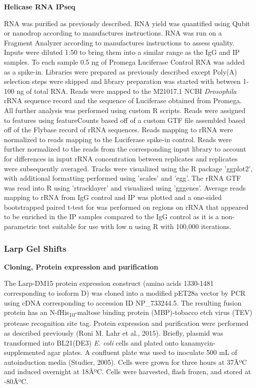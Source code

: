 \documentclass[12pt,oneside]{reedthesis}
\begin{document}
\textbf{Helicase RNA IPseq}

RNA was purified as previously described. RNA yield was quantified using
Qubit or nanodrop according to manufactures instructions. RNA was run on
a Fragment Analyzer according to manufactures instructions to assess
quality. Inputs were diluted 1:50 to bring them into a similar range as
the IgG and IP samples. To each sample 0.5 ng of Promega Luciferase
Control RNA was added as a spike-in. Libraries were prepared as
previously described except Poly(A) selection steps were skipped and
library preparation was started with between 1-100 ng of total RNA.
Reads were mapped to the M21017.1 NCBI \emph{Drosophila} rRNA sequence record
and the sequence of Luciferase obtained from Promega. All further
analysis was performed using custom R scripts. Reads were assigned to
features using featureCounts based off of a custom GTF file assembled
based off of the Flybase record of rRNA sequences. Reads mapping to rRNA
were normalized to reads mapping to the Luciferase spike-in control.
Reads were further normalized to the reads from the corresponding input
library to account for differences in input rRNA concentration between
replicates and replicates were subsequently averaged. Tracks were
visualized using the R package 'ggplot2', with additional formatting
performed using 'scales' and 'egg'. The rRNA GTF was read into R using
'rtracklayer' and visualized using 'gggenes'. Average reads mapping to
rRNA from IgG control and IP was plotted and a one-sided bootstrapped
paired t-test for was performed on regions on rRNA that appeared to be
enriched in the IP samples compared to the IgG control as it is a
non-parametric test suitable for use with low n using R with 100,000
iterations.

\hypertarget{larp-gel-shifts}{%
\subsubsection{Larp Gel Shifts}\label{larp-gel-shifts}}

\textbf{Cloning, Protein expression and purification}

The Larp-DM15 protein expression construct (amino acids 1330-1481
corresponding to isoform D) was cloned into a modified pET28a vector by
PCR using cDNA corresponding to accession ID NP\_733244.5. The resulting
fusion protein has an N-fHis\textsubscript{10}-maltose binding protein (MBP)-tobacco
etch virus (TEV) protease recognition site tag. Protein expression and
purification were performed as described previously
(Roni M. Lahr et al., 2015). Briefly, plasmid was
transformed into BL21(DE3) \emph{E. coli} cells and plated onto
kanamycin-supplemented agar plates. A confluent plate was used to
inoculate 500 mL of autoinduction media
(Studier, 2005). Cells were grown for
three hours at 37ÂºC and induced overnight at 18ÂºC. Cells were harvested,
flash frozen, and stored at -80ÂºC.
\end{document}
